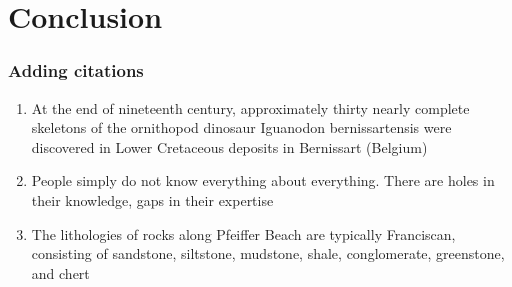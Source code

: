 \documentclass[aspectratio=169, 12pt, t]{beamer}
\begin{document}
\section{Conclusion}


\begin{frame}
    \frametitle{Adding citations}
    \begin{enumerate}
        \item At the end of nineteenth century, approximately thirty nearly complete skeletons of the ornithopod dinosaur Iguanodon bernissartensis were discovered in Lower Cretaceous deposits in Bernissart (Belgium)~\cite{verdu2017individual}
        \item People simply do not know everything about everything. There are holes in their knowledge, gaps in their expertise \cite{dunning2011dunning}
        \item The lithologies of rocks along Pfeiffer Beach are typically Franciscan, consisting of sandstone, siltstone, mudstone, shale, conglomerate, greenstone, and chert \cite{underwood1977pfeiffer}
    \end{enumerate}
\end{frame}

\bibliographyslide{}
\end{document}
